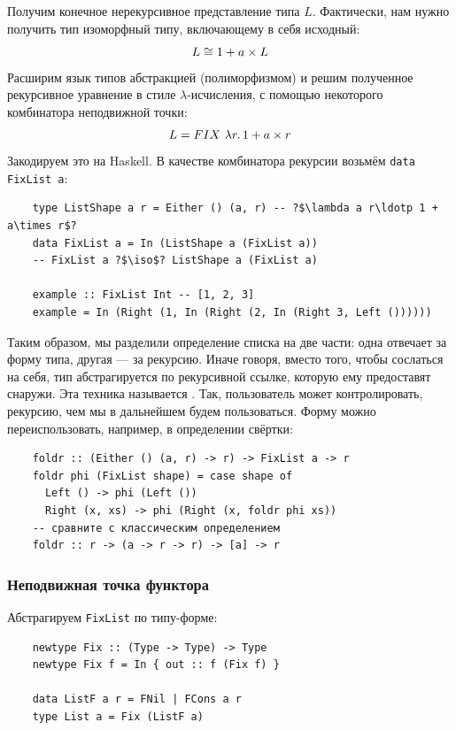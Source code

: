 Получим конечное нерекурсивное представление типа $L$.
Фактически, нам нужно получить тип изоморфный типу, включающему в себя исходный:
\[
    L \cong 1 + a \times L
\]
Расширим язык типов абстракцией (полиморфизмом) и решим полученное рекурсивное уравнение в стиле $\lambda$-исчисления, с помощью некоторого комбинатора неподвижной точки:
\[
    L = FIX~\lambda r\ldotp 1 + a \times r
\]
Закодируем это на Haskell.
В качестве комбинатора рекурсии возьмём \texttt{data FixList a}:
\begin{verbatim}
    type ListShape a r = Either () (a, r) -- ?$\lambda a r\ldotp 1 + a\times r$?
    data FixList a = In (ListShape a (FixList a))
    -- FixList a ?$\iso$? ListShape a (FixList a)

    example :: FixList Int -- [1, 2, 3]
    example = In (Right (1, In (Right (2, In (Right 3, Left ())))))
\end{verbatim}

Таким образом, мы разделили определение списка на две части: одна отвечает за форму типа, другая --- за рекурсию.
Иначе говоря, вместо того, чтобы сослаться на себя, тип абстрагируется по рекурсивной ссылке, которую ему предоставят снаружи.
Эта техника называется .
Так, пользователь может контролировать, рекурсию, чем мы в дальнейшем будем пользоваться.
Форму можно переиспользовать, например, в определении свёртки:
\begin{verbatim}
    foldr :: (Either () (a, r) -> r) -> FixList a -> r
    foldr phi (FixList shape) = case shape of
      Left () -> phi (Left ())
      Right (x, xs) -> phi (Right (x, foldr phi xs))
    -- сравните с классическим определением
    foldr :: r -> (a -> r -> r) -> [a] -> r
\end{verbatim}

\subsubsection{Неподвижная точка функтора} \label{subsubsec:functor-fixpoint}

Абстрагируем \texttt{FixList} по типу-форме:
\begin{verbatim}
    newtype Fix :: (Type -> Type) -> Type
    newtype Fix f = In { out :: f (Fix f) }

    data ListF a r = FNil | FCons a r
    type List a = Fix (ListF a)
\end{verbatim}

